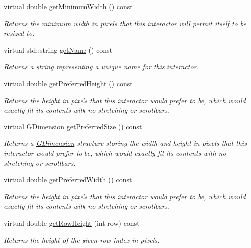 \begin{DoxyCompactItemize}
virtual double \mbox{\hyperlink{classGInteractor_a59e668114fe3d49d2a0f28deb258f7c8}{get\+Minimum\+Width}} () const
\begin{DoxyCompactList}\small\item\em Returns the minimum width in pixels that this interactor will permit itself to be resized to. \end{DoxyCompactList}\item 
virtual std\+::string \mbox{\hyperlink{classGInteractor_a8a60438a5b55d0b2ceb35c8674b9d8c5}{get\+Name}} () const
\begin{DoxyCompactList}\small\item\em Returns a string representing a unique name for this interactor. \end{DoxyCompactList}\item 
virtual double \mbox{\hyperlink{classGInteractor_a747de0961653847bdc6615dbf756d715}{get\+Preferred\+Height}} () const
\begin{DoxyCompactList}\small\item\em Returns the height in pixels that this interactor would prefer to be, which would exactly fit its contents with no stretching or scrollbars. \end{DoxyCompactList}\item 
virtual \mbox{\hyperlink{classGDimension}{G\+Dimension}} \mbox{\hyperlink{classGInteractor_a4aabbee761d8e9116275401131b7ccd1}{get\+Preferred\+Size}} () const
\begin{DoxyCompactList}\small\item\em Returns a \mbox{\hyperlink{classGDimension}{G\+Dimension}} structure storing the width and height in pixels that this interactor would prefer to be, which would exactly fit its contents with no stretching or scrollbars. \end{DoxyCompactList}\item 
virtual double \mbox{\hyperlink{classGInteractor_a82bca31d37700fb0e35d2743352efd5e}{get\+Preferred\+Width}} () const
\begin{DoxyCompactList}\small\item\em Returns the height in pixels that this interactor would prefer to be, which would exactly fit its contents with no stretching or scrollbars. \end{DoxyCompactList}\item 
virtual double \mbox{\hyperlink{classGTable_a0215a742506665475b721ed12913808b}{get\+Row\+Height}} (int row) const
\begin{DoxyCompactList}\small\item\em Returns the height of the given row index in pixels. \end{DoxyCompactList}\item 

\end{DoxyCompactItemize}
